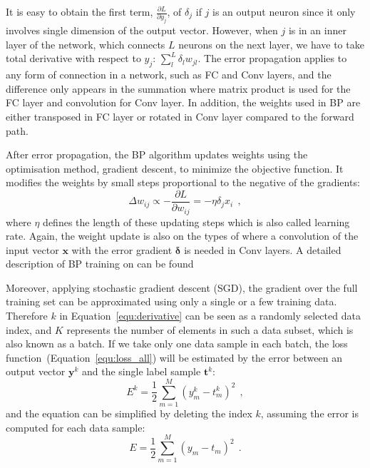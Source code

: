 It is easy to obtain the first term, $ \frac{\partial L}{\partial y_j}  $, of $ \delta_j $ if $j$ is an output neuron since it only involves \protect{} single dimension of the output vector.
However, when $j$ is in an inner layer of the network, which connects \protect{} $L$ neurons on the next layer, we have to take \protect{} total derivative with respect to $y_j$: $\sum_l^L \delta_l w_{jl}$.
The error propagation applies to any form of connection in a network, such as FC and Conv layers, and the difference only appears in the summation where \protect{} matrix product is used for the FC layer and convolution for \protect{} Conv layer.
In addition, the weights used in BP are either transposed in \protect{} FC layer or rotated in \protect{} Conv layer compared to the forward path.

After error propagation, the BP algorithm updates weights using the optimisation method, gradient descent, to minimize the objective function.
It modifies the weights by small steps proportional to the negative of the gradients:
\begin{equation}
\Delta w_{ij} \propto -\frac{\partial L}{\partial w_{ij}} = -\eta \delta_j x_i~~,
\label{equ:delta_w}
\end{equation}
where $\eta$ defines the length of these updating steps which is also called \protect{} learning rate.
Again, the weight update is also \protect{} \protect{} on the types of \protect{} \protect{} where a convolution of the input vector $\mathbf{x}$ with the error gradient  $\mathbf{\delta}$ is needed in Conv layers.
A detailed description of BP training on \protect{} \protect{} can be found \protect{} \protect{}\citep{bouvrie2006notes}\protect{}

Moreover, applying stochastic gradient descent (SGD), the gradient over the full training set can be approximated using only a single or a few training data.
Therefore $k$ in Equation~\ref{equ:derivative} can be seen as a randomly selected data index, and $K$ represents the number of elements in such a data subset, which is also known as a batch.
If we take only one data sample in each batch, the loss function~(Equation~\ref{equ:loss_all}) will be estimated by the error between an output vector $\mathbf{y}^k$ and the single label sample $\mathbf{t}^k$:
\begin{equation}
E^k = \frac{1}{2}\sum_{m=1}^M (y^{k}_{m}-t^{k}_{m})^{2}~~,
\label{equ:error_conv}
\end{equation}
and the equation can be simplified by deleting the index $k$, assuming the error is computed for each data sample:
\begin{equation}
E = \frac{1}{2}\sum_{m=1}^M (y_{m}-t_{m})^{2}~~.
\label{equ:error_non}
\end{equation}



